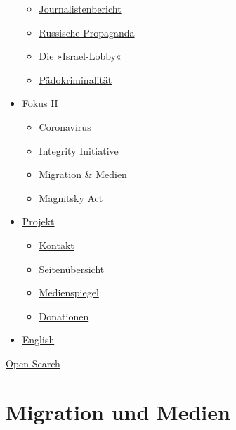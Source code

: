 \begin{itemize}
  \begin{itemize}
  \tightlist
  \item
    \href{https://swprs.org/bericht-eines-journalisten/}{Journalistenbericht}
  \item
    \href{https://swprs.org/russische-propaganda/}{Russische Propaganda}
  \item
    \href{https://swprs.org/die-israel-lobby-fakten-und-mythen/}{Die
    »Israel-Lobby«}
  \item
    \href{https://swprs.org/geopolitik-und-paedokriminalitaet/}{Pädokriminalität}
  \end{itemize}
\item
  \href{https://swprs.org/migration-und-medien/}{Fokus II}

  \begin{itemize}
  \tightlist
  \item
    \href{https://swprs.org/covid-19-hinweis-ii/}{Coronavirus}
  \item
    \href{https://swprs.org/die-integrity-initiative/}{Integrity
    Initiative}
  \item
    \href{https://swprs.org/migration-und-medien/}{Migration \& Medien}
  \item
    \href{https://swprs.org/der-fall-magnitsky/}{Magnitsky Act}
  \end{itemize}
\item
  \href{https://swprs.org/kontakt/}{Projekt}

  \begin{itemize}
  \tightlist
  \item
    \href{https://swprs.org/kontakt/}{Kontakt}
  \item
    \href{https://swprs.org/uebersicht/}{Seitenübersicht}
  \item
    \href{https://swprs.org/medienspiegel/}{Medienspiegel}
  \item
    \href{https://swprs.org/donationen/}{Donationen}
  \end{itemize}
\item
  \href{https://swprs.org/contact/}{English}
\end{itemize}

\protect\hyperlink{}{Open Search}

\hypertarget{migration-und-medien}{%
\section{Migration und Medien}\label{migration-und-medien}}

